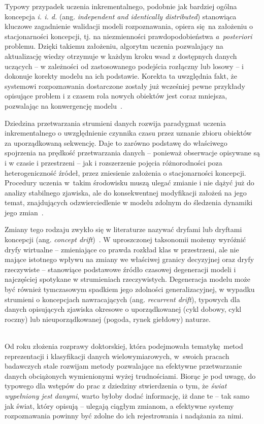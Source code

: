 Typowy przypadek uczenia inkrementalnego, podobnie jak bardziej ogólna koncepcja \emph{i. i. d.} (ang. \emph{independent and identically distributed}) stanowiąca kluczowe zagadnienie walidacji modeli rozpoznawania, opiera się na założeniu o stacjonarności koncepcji, tj. na niezmienności prawdopodobieństwa \emph{a~posteriori} problemu. Dzięki takiemu założeniu, algorytm uczenia pozwalający na aktualizację wiedzy otrzymuje w każdym kroku wsad z dostępnych danych uczących -- w zależności od zastosowanego podejścia rozłączny lub losowy -- i dokonuje korekty modelu na ich podstawie. Korekta ta uwzględnia fakt, że systemowi rozpoznawania dostarczone zostały już wcześniej pewne przykłady opisujące problem i z czasem rola nowych obiektów jest coraz mniejsza, pozwalając na konwergencję modelu~.

Dziedzina przetwarzania strumieni danych rozwija paradygmat uczenia inkrementalnego o uwzględnienie czynnika czasu przez uznanie zbioru obiektów za uporządkowaną sekwencję. Daje to zarówno podstawę do właściwego spojrzenia na prędkość przetwarzania danych -- ponieważ obserwacje opisywane są i w czasie i przestrzeni -- jak i rozszerzenie pojęcia różnorodności poza heterogeniczność źródeł, przez zniesienie założenia o stacjonarności koncepcji. Procedury uczenia w~takim środowisku muszą ulegać zmianie i nie dążyć już do analizy stabilnego zjawiska, ale do konsekwentnej modyfikacji założeń na jego temat, znajdujących odzwierciedlenie w modelu zdolnym do śledzenia dynamiki jego zmian~. 

Zmiany tego rodzaju zwykło się w literaturze nazywać dryfami lub dryftami koncepcji (ang. \emph{concept drift})~. W uproszczonej taksonomii możemy wyróżnić dryfy wirtualne -- zmieniające co prawda rozkład klas w przestrzeni, ale nie mające istotnego wpływu na zmiany we właściwej granicy decyzyjnej oraz dryfy rzeczywiste -- stanowiące podstawowe źródło czasowej degeneracji modeli i najczęściej spotykane w strumieniach rzeczywistych. Degeneracja modelu może być również tymczasowym spadkiem jego zdolności generalizacyjnej, w wypadku strumieni o koncepcjach nawracających (ang. \emph{recurrent drift}), typowych dla danych opisujących zjawiska okresowe o uporządkowanej (cykl dobowy, cykl roczny) lub nieuporządkowanej (pogoda, rynek giełdowy) naturze.

\vspace{-.5em}\noindent {}~\\
\noindent Od roku złożenia rozprawy doktorskiej, która podejmowała tematykę metod reprezentacji i klasyfikacji danych wielowymiarowych, w~swoich pracach badawczych stale rozwijam metody pozwalające na efektywne przetwarzanie danych obciążonych wymienionymi wyżej trudnościami. Biorąc je pod uwagę, do typowego dla wstępów do prac z dziedziny stwierdzenia o tym, że \emph{świat wypełniony jest danymi}, warto byłoby dodać informację, iż dane te -- tak samo jak świat, który opisują -- ulegają ciągłym zmianom, a efektywne systemy rozpoznawania powinny być zdolne do ich rejestrowania i nadążania za nimi.

